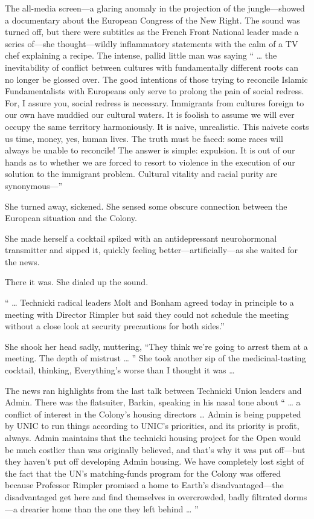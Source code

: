 The all-media screen—a glaring anomaly in the projection of the jungle—showed a documentary about the European Congress of the New Right. The sound was turned off, but there were subtitles as the French Front National leader made a series of—she thought—wildly inflammatory statements with the calm of a TV chef explaining a recipe. The intense, pallid little man was saying “ … the inevitability of conflict between cultures with fundamentally different roots can no longer be glossed over. The good intentions of those trying to reconcile Islamic Fundamentalists with Europeans only serve to prolong the pain of social redress. For, I assure you, social redress is necessary. Immigrants from cultures foreign to our own have muddied our cultural waters. It is foolish to assume we will ever occupy the same territory harmoniously. It is naive, unrealistic. This naivete costs us time, money, yes, human lives. The truth must be faced: some races will always be unable to reconcile! The answer is simple: expulsion. It is out of our hands as to whether we are forced to resort to violence in the execution of our solution to the immigrant problem. Cultural vitality and racial purity are synonymous—”

She turned away, sickened. She sensed some obscure connection between the European situation and the Colony.

She made herself a cocktail spiked with an antidepressant neurohormonal transmitter and sipped it, quickly feeling better—artificially—as she waited for the news.

There it was. She dialed up the sound.

“ … Technicki radical leaders Molt and Bonham agreed today in principle to a meeting with Director Rimpler but said they could not schedule the meeting without a close look at security precautions for both sides.”

She shook her head sadly, muttering, “They think we’re going to arrest them at a meeting. The depth of mistrust … ” She took another sip of the medicinal-tasting cocktail, thinking, Everything’s worse than I thought it was …

The news ran highlights from the last talk between Technicki Union leaders and Admin. There was the flatsuiter, Barkin, speaking in his nasal tone about “ … a conflict of interest in the Colony’s housing directors … Admin is being puppeted by UNIC to run things according to UNIC’s priorities, and its priority is profit, always. Admin maintains that the technicki housing project for the Open would be much costlier than was originally believed, and that’s why it was put off—but they haven’t put off developing Admin housing. We have completely lost sight of the fact that the UN’s matching-funds program for the Colony was offered because Professor Rimpler promised a home to Earth’s disadvantaged—the disadvantaged get here and find themselves in overcrowded, badly filtrated dorms—a drearier home than the one they left behind … ”

